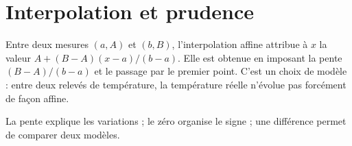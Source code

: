 \documentclass[../cours_2de.tex]{subfiles}
\begin{document}
\section{Interpolation et prudence}
Entre deux mesures $(a,A)$ et $(b,B)$, l'interpolation affine attribue à $x$ la valeur
$A+(B-A)(x-a)/(b-a)$.
Elle est obtenue en imposant la pente $(B-A)/(b-a)$ et le passage par le premier point.
C'est un choix de modèle : entre deux relevés de température, la température réelle n'évolue pas forcément de façon affine.
\begin{retenir}
La pente explique les variations ; le zéro organise le signe ; une différence permet de comparer deux modèles.
\end{retenir}
\end{document}
